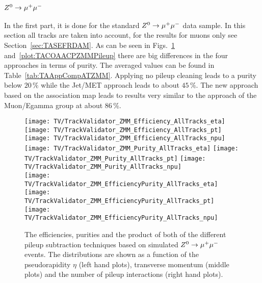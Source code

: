 \subsubsection{$\Zz\rightarrow\MM$ \label{sec:TASEFRDACPZMM}}
In the first part, it is done for the standard $\Zz\rightarrow\MM$ data sample. In this section all tracks are taken into account, for the results for muons only see Section~\ref{sec:TASEFRDAM}. As can be seen in Figs.~\ref{plot:TACOAACPZMMSignal} and~\ref{plot:TACOAACPZMMPileup} there are big differences in the four approaches in terms of purity. The averaged values can be found in Table~\ref{tab:TAAppCompATZMM}. Applying no pileup cleaning leads to a purity below $20\,\%$ while the Jet/MET approach leads to about $45\,\%$. The new approach based on the association map leads to results very similar to the approach of the Muon/Egamma group at about $86\,\%$.



\begin{figure}[Ht]
    \centering
    \texttt{[image: TV/TrackValidator\_ZMM\_Efficiency\_AllTracks\_eta]}
    \texttt{[image: TV/TrackValidator\_ZMM\_Efficiency\_AllTracks\_pt]}
    \texttt{[image: TV/TrackValidator\_ZMM\_Efficiency\_AllTracks\_npu]}
    \\
    \texttt{[image: TV/TrackValidator\_ZMM\_Purity\_AllTracks\_eta]}
    \texttt{[image: TV/TrackValidator\_ZMM\_Purity\_AllTracks\_pt]}
    \texttt{[image: TV/TrackValidator\_ZMM\_Purity\_AllTracks\_npu]}
    \\
    \texttt{[image: TV/TrackValidator\_ZMM\_EfficiencyPurity\_AllTracks\_eta]}
    \texttt{[image: TV/TrackValidator\_ZMM\_EfficiencyPurity\_AllTracks\_pt]}
    \texttt{[image: TV/TrackValidator\_ZMM\_EfficiencyPurity\_AllTracks\_npu]}
    \caption[Efficiencies, purities and their product of the different pileup subtraction techniques based on simulated $\Zz\rightarrow\MM$ events]{The efficiencies, purities and the product of both of the different pileup subtraction techniques based on simulated $\Zz\rightarrow\MM$ events. The distributions are shown as a function of the pseudorapidity $\eta$ (left hand plots), transverse momentum (middle plots) and the number of pileup interactions (right hand plots). \label{plot:TACOAACPZMMSignal}}
\end{figure}

